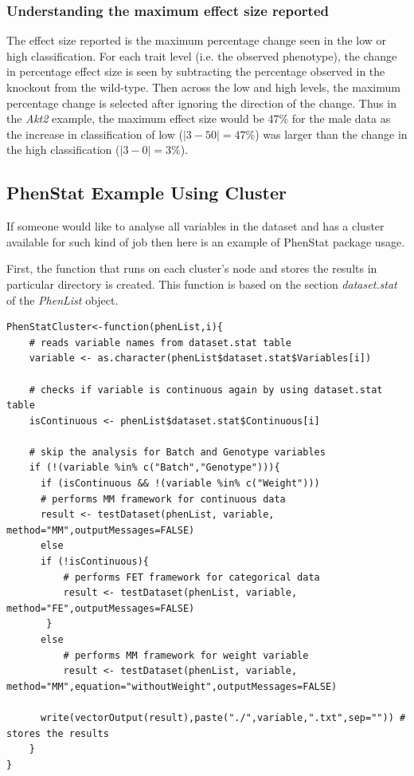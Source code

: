\documentclass[12pt,a4paper]{article}
\begin{document}
\subsubsection{Understanding the maximum effect size reported}
The effect size reported is the maximum percentage change seen in the low or high classification. For each trait level (i.e. the observed phenotype), the change in percentage effect size is seen by subtracting the percentage observed in the knockout from the wild-type. Then across the low and high levels, the maximum percentage change is selected after ignoring the direction of the change. Thus in the \textit{Akt2} example, the maximum effect size would be 47\% for the male data as the increase in classification of low ($|3-50|=47$\%) was larger than the change in the high classification ($|3-0|=3$\%). 

\subsection{PhenStat Example Using Cluster}
If someone would like to analyse all variables in the dataset and has a cluster available for such kind of job then here is an example of PhenStat package usage.

First, the function that runs on each cluster's node and stores the results in particular directory is created. This function is based on the section \textit{dataset.stat} of the \textit{PhenList} object. 
\begingroup
\fontsize{8pt}{12pt}\selectfont
\begin{verbatim}
PhenStatCluster<-function(phenList,i){
    # reads variable names from dataset.stat table
    variable <- as.character(phenList$dataset.stat$Variables[i]) 
    
    # checks if variable is continuous again by using dataset.stat table
    isContinuous <- phenList$dataset.stat$Continuous[i]	
    
    # skip the analysis for Batch and Genotype variables
    if (!(variable %in% c("Batch","Genotype"))){	
      if (isContinuous && !(variable %in% c("Weight"))) 
	  # performs MM framework for continuous data
	  result <- testDataset(phenList, variable, method="MM",outputMessages=FALSE)	 
      else
	  if (!isContinuous){
	      # performs FET framework for categorical data
	      result <- testDataset(phenList, variable, method="FE",outputMessages=FALSE)	
	   }
	  else
	      # performs MM framework for weight variable
	      result <- testDataset(phenList, variable, method="MM",equation="withoutWeight",outputMessages=FALSE) 
	      
      write(vectorOutput(result),paste("./",variable,".txt",sep="")) # stores the results
    }
}
\end{verbatim}
\endgroup
\end{document}
